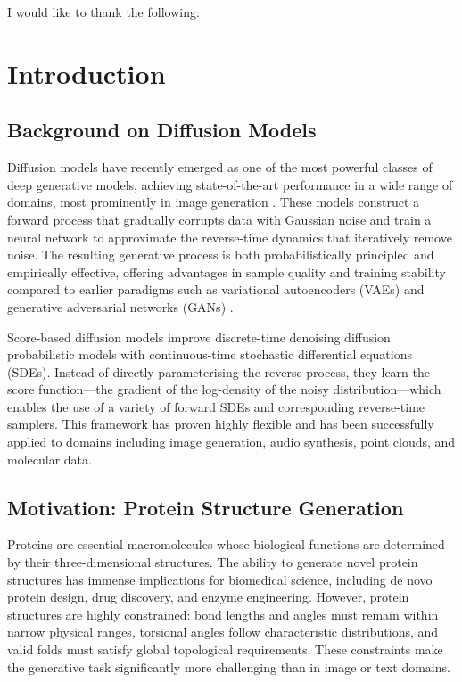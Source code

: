 \documentclass[a4paper,12pt]{article}
\begin{document}
I would like to thank the following:
\clearpage

\tableofcontents
\listoffigures
\listoftables
\clearpage


\section{Introduction}
\subsection{Background on Diffusion Models}
Diffusion models have recently emerged as one of the most powerful classes of deep generative models, achieving state-of-the-art performance in a wide range of domains, most prominently in image generation \cite{hoDenoisingDiffusionProbabilistic2020, dhariwal2021DiffusionModelsBeat}. These models construct a forward process that gradually corrupts data with Gaussian noise and train a neural network to approximate the reverse-time dynamics that iteratively remove noise. The resulting generative process is both probabilistically principled and empirically effective, offering advantages in sample quality and training stability compared to earlier paradigms such as variational autoencoders (VAEs) \cite{kingma2022AutoEncodingVariationalBayes} and generative adversarial networks (GANs) \cite{goodfellow2020GenerativeAdversarialNetworks}.

Score-based diffusion models \cite{song2020score,songMaximumLikelihoodTraining2021} improve discrete-time denoising diffusion probabilistic models with continuous-time stochastic differential equations (SDEs). Instead of directly parameterising the reverse process, they learn the score function---the gradient of the log-density of the noisy distribution---which enables the use of a variety of forward SDEs and corresponding reverse-time samplers. This framework has proven highly flexible and has been successfully applied to domains including image generation, audio synthesis, point clouds, and molecular data.

\subsection{Motivation: Protein Structure Generation}
Proteins are essential macromolecules whose biological functions are determined by their three-dimensional structures. The ability to generate novel protein structures has immense implications for biomedical science, including de novo protein design, drug discovery, and enzyme engineering. However, protein structures are highly constrained: bond lengths and angles must remain within narrow physical ranges, torsional angles follow characteristic distributions, and valid folds must satisfy global topological requirements. These constraints make the generative task significantly more challenging than in image or text domains.
\end{document}

